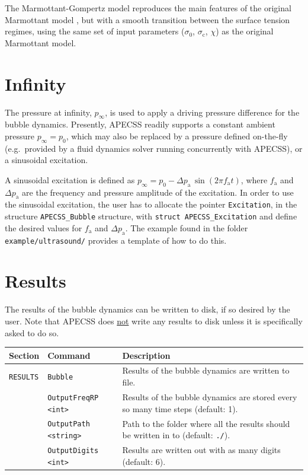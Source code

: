 The Marmottant-Gompertz model reproduces the main features of the original Marmottant model \citep{Guemmer2021}, but with a smooth transition between the surface tension regimes, using the same set of input parameters ($\sigma_0$, $\sigma_\text{c}$, $\chi$) as the original Marmottant model.

\section{Infinity}
\label{sec:infinity}

The pressure at infinity, $p_\infty$, is used to apply a driving pressure difference for the bubble dynamics. Presently, APECSS readily supports a constant ambient pressure $p_\infty = p_0$, which may also be replaced by a pressure defined on-the-fly (e.g.~provided by a fluid dynamics solver running concurrently with APECSS), or a sinusoidal excitation. 

A sinusoidal excitation is defined as $p_\infty = p_0 - \Delta p_\mathrm{a} \, \sin(2 \pi f_\mathrm{a} t)$, where $f_\mathrm{a}$ and $\Delta p_\mathrm{a}$ are the frequency and pressure amplitude of the excitation. In order to use the sinusoidal excitation, the user has to allocate the pointer {\tt *Excitation}, in the structure {\tt APECSS\_Bubble} structure, with {\tt struct APECSS\_Excitation} and define the desired values for  $f_\mathrm{a}$ and $\Delta p_\mathrm{a}$. The example found in the folder {\tt example/ultrasound/} provides a template of how to do this.

\section{Results}
\label{sec:bubble_results}

The results of the bubble dynamics can be written to disk, if so desired by the user. Note that APECSS does \uline{not} write any results to disk unless it is specifically asked to do so.

\vspace{0.8em}

\noindent
\begin{tabular}{p{} p{} p{}}
    \textbf{Section} &\textbf{Command} & \textbf{Description} 
\vspace{1mm} \\ \hline
{\tt RESULTS} & {\tt Bubble} & Results of the bubble dynamics are written to file.\\ 
& {\tt OutputFreqRP <int>} & Results of the bubble dynamics are stored every so many time steps (default: 1).\\ 
& {\tt OutputPath <string>} & Path to the folder where all the results should be written in to (default: {\tt ./}).\\
& {\tt OutputDigits <int>} & Results are written out with as many digits (default: 6).\\
 \hline
\end{tabular} \vspace{1em}


